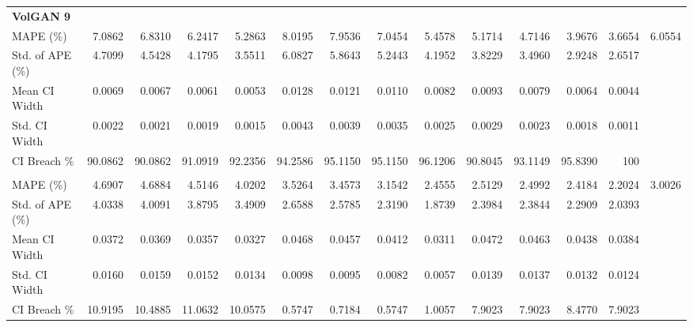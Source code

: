 \documentclass{article}
\begin{document}
\begin{table}[h!]
{\begin{tabular}{l rrrrrrrrrrrrr}
\multicolumn{14}{l}{\textbf{VolGAN 9}} \\
MAPE (\%) & 7.0862 & 6.8310 & 6.2417 & 5.2863 & 8.0195 & 7.9536 & 7.0454 & 5.4578 & 5.1714 & 4.7146 & 3.9676 & 3.6654 & 6.0554 \\
Std. of APE (\%) & 4.7099 & 4.5428 & 4.1795 & 3.5511 & 6.0827 & 5.8643 & 5.2443 & 4.1952 & 3.8229 & 3.4960 & 2.9248 & 2.6517 &  \\
Mean CI Width & 0.0069 & 0.0067 & 0.0061 & 0.0053 & 0.0128 & 0.0121 & 0.0110 & 0.0082 & 0.0093 & 0.0079 & 0.0064 & 0.0044 &  \\
Std. CI Width & 0.0022 & 0.0021 & 0.0019 & 0.0015 & 0.0043 & 0.0039 & 0.0035 & 0.0025 & 0.0029 & 0.0023 & 0.0018 & 0.0011 &  \\
CI Breach \% & 90.0862 & 90.0862 & 91.0919 & 92.2356 & 94.2586 & 95.1150 & 95.1150 & 96.1206 & 90.8045 & 93.1149 & 95.8390 & 100 &  \\
\addlinespace

\multicolumn{14}{l}{\textbf{Diffusion}} \\
MAPE (\%) & 4.6907 & 4.6884 & 4.5146 & 4.0202 & 3.5264 & 3.4573 & 3.1542 & 2.4555 & 2.5129 & 2.4992 & 2.4184 & 2.2024 & 3.0026 \\
Std. of APE (\%) & 4.0338 & 4.0091 & 3.8795 & 3.4909 & 2.6588 & 2.5785 & 2.3190 & 1.8739 & 2.3984 & 2.3844 & 2.2909 & 2.0393 &  \\
Mean CI Width & 0.0372 & 0.0369 & 0.0357 & 0.0327 & 0.0468 & 0.0457 & 0.0412 & 0.0311 & 0.0472 & 0.0463 & 0.0438 & 0.0384 &  \\
Std. CI Width & 0.0160 & 0.0159 & 0.0152 & 0.0134 & 0.0098 & 0.0095 & 0.0082 & 0.0057 & 0.0139 & 0.0137 & 0.0132 & 0.0124 & \\
CI Breach \% & 10.9195 & 10.4885 & 11.0632 & 10.0575 & 0.5747 & 0.7184 & 0.5747 & 1.0057 & 7.9023 & 7.9023 & 8.4770 & 7.9023 &  \\
\bottomrule
\end{tabular}
}
\end{table}
\end{document}
